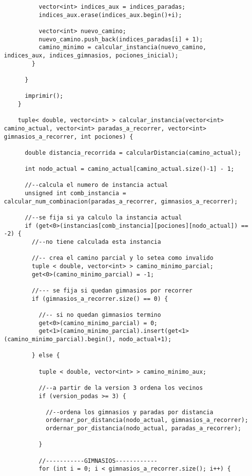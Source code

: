 \begin{lstlisting}
          vector<int> indices_aux = indices_paradas;
          indices_aux.erase(indices_aux.begin()+i);

          vector<int> nuevo_camino;
          nuevo_camino.push_back(indices_paradas[i] + 1);
          camino_minimo = calcular_instancia(nuevo_camino, indices_aux, indices_gimnasios, pociones_inicial);
        }

      }

      imprimir();
    }

    tuple< double, vector<int> > calcular_instancia(vector<int> camino_actual, vector<int> paradas_a_recorrer, vector<int> gimnasios_a_recorrer, int pociones) {

      double distancia_recorrida = calcularDistancia(camino_actual);

      int nodo_actual = camino_actual[camino_actual.size()-1] - 1;

      //--calcula el numero de instancia actual
      unsigned int comb_instancia = calcular_num_combinacion(paradas_a_recorrer, gimnasios_a_recorrer);

      //--se fija si ya calculo la instancia actual
      if (get<0>(instancias[comb_instancia][pociones][nodo_actual]) == -2) {
        //--no tiene calculada esta instancia

        //-- crea el camino parcial y lo setea como invalido
        tuple < double, vector<int> > camino_minimo_parcial;
        get<0>(camino_minimo_parcial) = -1;

        //--- se fija si quedan gimnasios por recorrer
        if (gimnasios_a_recorrer.size() == 0) {

          //-- si no quedan gimnasios termino
          get<0>(camino_minimo_parcial) = 0;
          get<1>(camino_minimo_parcial).insert(get<1>(camino_minimo_parcial).begin(), nodo_actual+1);
        
        } else {

          tuple < double, vector<int> > camino_minimo_aux;

          //--a partir de la version 3 ordena los vecinos
          if (version_podas >= 3) {

            //--ordena los gimnasios y paradas por distancia
            ordernar_por_distancia(nodo_actual, gimnasios_a_recorrer);
            ordernar_por_distancia(nodo_actual, paradas_a_recorrer);

          }

          //-----------GIMNASIOS------------
          for (int i = 0; i < gimnasios_a_recorrer.size(); i++) {
            

\end{lstlisting}
